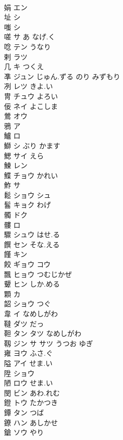 \documentclass[8pt]{extreport}
\begin{document}
\begin{CJK}{UTF8}{min}
\\	娟	エン			
\\	址	シ			
\\	嗤	シ			
\\	嗟	サ あ なげ.く			
\\	唸	テン うなり			
\\	剌	ラツ			
\\	几	キ つくえ			
\\	凖	ジュン じゅん.ずる のり みずもり			
\\	冽	レツ きよ.い			
\\	冑	チュウ よろい			
\\	佞	ネイ よこしま			
\\	鶯	オウ			
\\	鴉	ア			
\\	鱸	ロ			
\\	鰤	シ ぶり かます			
\\	鰓	サイ えら			
\\	鰊	レン			
\\	鰈	チョウ かれい			
\\	鮓	サ			
\\	鬆	ショウ シュ			
\\	髷	キョク わげ			
\\	髑	ドク			
\\	髏	ロ			
\\	驟	シュウ はせ.る			
\\	饌	セン そな.える			
\\	饉	キン			
\\	餃	ギョウ コウ			
\\	飄	ヒョウ つむじかぜ			
\\	顰	ヒン しか.める			
\\	顆	カ			
\\	韶	ショウ つぐ			
\\	韋	イ なめしがわ			
\\	韃	ダツ だっ			
\\	靼	タン タツ なめしがわ			
\\	靱	ジン サ サツ うつお ゆぎ			
\\	雍	ヨウ ふさ.ぐ			
\\	隘	アイ せま.い			
\\	陞	ショウ			
\\	陋	ロウ せま.い			
\\	閔	ビン あわ.れむ			
\\	鐙	トウ たかつき			
\\	鐔	タン つば			
\\	鐐	ハン あしかせ			
\\	鎗	ソウ やり			

\end{CJK}
\end{document}
